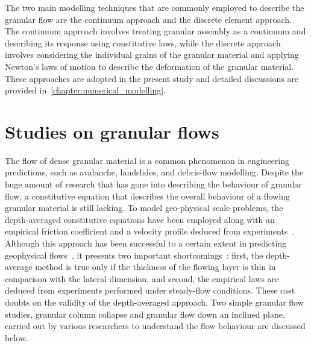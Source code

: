 The two main modelling techniques that are commonly employed to describe the 
granular flow are the continuum approach and the discrete element approach. The 
continuum approach involves treating granular assembly as a continuum and 
describing its response using constitutive laws, while the discrete approach 
involves considering the individual grains of the granular material and 
applying Newton's laws of motion to describe the deformation of the granular 
material. These approaches are adopted in the present study and detailed 
discussions are provided in~\cref{chapter:numerical_modelling}. 

\section{Studies on granular flows}
The flow of dense granular material is a common phenomenon in engineering 
predictions, such as avalanche, landslides, and debris-flow modelling. Despite 
the huge amount of research that has gone into describing the behaviour of 
granular flow, a constitutive equation that describes the overall behaviour of 
a flowing granular material is still lacking. To model geo-physical scale 
problems, the depth-averaged constitutive equations have been employed along 
with an empirical friction coefficient and a velocity profile deduced from 
experiments~\citep{Midi2004,Iverson2003,Pouliquen1999}. Although this approach 
has been successful to a certain extent in predicting geophysical 
flows~\citep{Pouliquen2002a, Hutter1995}, it presents two important 
shortcomings~\citep{Lajeunesse2005}: first, the depth-average method is true 
only if the thickness of the flowing layer is thin in comparison with the 
lateral dimension, and second, the empirical laws are deduced from experiments 
performed under steady-flow conditions. These cast doubts on the validity of 
the depth-averaged approach. Two simple granular flow studies, granular column 
collapse and granular flow down an inclined plane, carried out by 
various researchers to understand the flow behaviour are discussed below.

